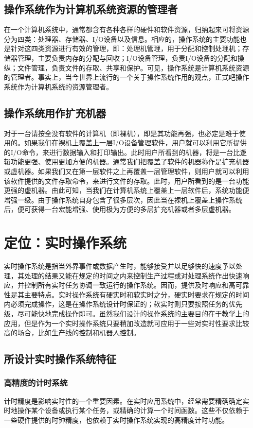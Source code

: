 \documentclass[UTF8,nofonts,cs4size]{ctexrep}
\begin{document}
\subsection{操作系统作为计算机系统资源的管理者}
在一个计算机系统中，通常都含有各种各样的硬件和软件资源，归纳起来可将资源分为四类：处理器、存储器、I/O设备以及信息。相应的，操作系统的主要功能也是针对这四类资源进行有效的管理，即：处理机管理，用于分配和控制处理机；存储器管理，主要负责内存的分配与回收；I/O设备管理，负责I/O设备的分配和操纵；文件管理，负责文件的存取、共享和保护。可见，操作系统是计算机系统资源的管理者。事实上，当今世界上流行的一个关于操作系统作用的观点，正式吧操作系统作为计算机系统的资源管理者。
\subsection{操作系统用作扩充机器}
对于一台请按全没有软件的计算机（即裸机），即是其功能再强，也必定是难于使用的。如果我们在裸机上覆盖上一层I/O设备管理软件，用户就可以利用它所提供的I/O命令，来进行数据输入和打印输出。此时用户所看到的机器，将是一台比逻辑功能更强、使用更加方便的机器。通常我们把覆盖了软件的机器称作是扩充机器或虚机器。如果我们又在第一层软件之上再覆盖一层管理软件，则用户就可以利用该软件提供的文件存取命令，来进行文件的存取。此时，用户所看到的是一台功能更强的虚机器。由此可知，当我们在计算机系统上覆盖上一层软件后，系统功能便增强一级。由于操作系统自身包含了很多层次，因此当在裸机上覆盖上操作系统后，便可获得一台宏能增强、使用极为方便的多层扩充机器或者多层虚机器。
\section{定位：实时操作系统}
实时操作系统是指当外界事件或数据产生时，能够接受并以足够快的速度予以处理，其处理的结果又能在规定的时间之内来控制生产过程或对处理系统作出快速响应，并控制所有实时任务协调一致运行的操作系统。因而，提供及时响应和高可靠性是其主要特点。实时操作系统有硬实时和软实时之分，硬实时要求在规定的时间内必须完成操作，这是在操作系统设计时保证的；软实时则只要按照任务的优先级，尽可能快地完成操作即可。虽然我们设计的操作系统的主要目的在于教学上的应用，但是作为一个实时操作系统只要稍加改造就可应用于一些对实时性要求比较高的场合，比如生产线的控制和机器人控制。
\subsection{所设计实时操作系统特征}
\subsubsection{高精度的计时系统}
计时精度是影响实时性的一个重要因素。在实时应用系统中，经常需要精确确定实时地操作某个设备或执行某个任务，或精确的计算一个时间函数。这些不仅依赖于一些硬件提供的时钟精度，也依赖于实时操作系统实现的高精度计时功能。
\end{document}
